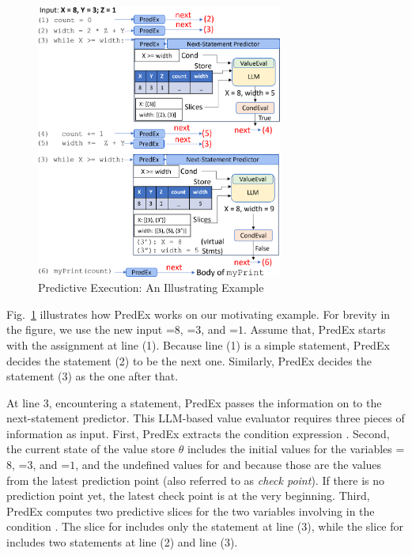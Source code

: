 \begin{figure}
\begin{center}
\includegraphics[width=3.2in]{example-4.png}
\vspace{-13pt}
\caption{Predictive Execution: An Illustrating Example}
\label{fig:illustration}
\end{center}
\end{figure}

Fig.~\ref{fig:illustration} illustrates how PredEx works on our
motivating example. For brevity in the figure, we use the new input
=$8$, =$3$, and =$1$. Assume that, PredEx
starts with the assignment at line (1). Because line (1) is a simple
statement, PredEx decides the statement (2) to be the next
one. Similarly, PredEx decides the statement (3) as the one after
that.

At line 3, encountering a  statement, PredEx passes the
information on to the next-statement predictor. This LLM-based value
evaluator requires three pieces of information as
input. First, PredEx extracts the condition expression . Second, the current state of the value store $\theta$ includes the
initial values for the variables =$8$, =$3$, and =$1$, and
the undefined values for  and  because those are the
values from the latest prediction point (also referred to as {\em
  check point}). If there is no prediction point yet, the latest check
point is at the very beginning. Third, PredEx computes two predictive
slices for the two variables involving in the condition
. The slice for  includes only the statement at line
(3), while the slice for  includes two statements at line (2)
and line (3).

